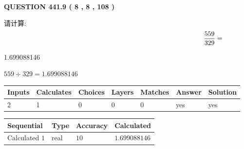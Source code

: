 \documentclass{ctexart}
\begin{document}
   
  
\vspace{0.2in}
  
{\textbf{\Large{QUESTION
441.9 
 ( 8 , 8 , 108 )
}}}
  
  
 
请计算:
\begin{equation}
\frac { %
559 }  {  %
329} = \nonumber
\end{equation}
 
 
 
\noindent{}
 
 

1.699088146
 
 
\noindent{}
 
 

 
 
 
\noindent{}
 
 

$ %
559 \div  %
329=   %
1.699088146$
 
 
\noindent{}
 
 

 
   
   
   
   
\noindent\begin{tabular}{|l|l|l|l|l|l|l|}
 \hline
Inputs & Calculates & Choices & Layers & Matches & Answer & Solution \\ \hline
 2  & 
 1  & 
 0
  & 
 0  & 
 0  & 
  yes & 
  yes 
  \\ \hline
 \end{tabular}
   
   
   
   
\noindent{}
   
   
  
  
\noindent\begin{tabular}{|l|l|l|l|}
\hline
 Sequential & Type & Accuracy & Calculated \\ 
\hline
 
 
  Calculated $  1 $ & real & $  10  $ & 
 $ 1.699088146 $ 
 \\  \hline  
 \end{tabular}
   
\end{document}
